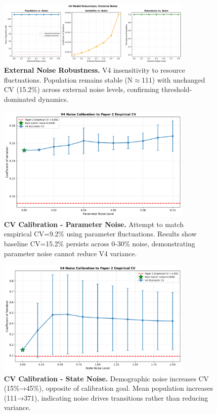 \documentclass[
]{article}
\begin{document}
\begin{figure}[htbp]
\centering
\includegraphics[width=0.85\textwidth]{figures/paper7_fig10_robustness_external.png}
\caption{\textbf{External Noise Robustness.} V4 insensitivity to resource fluctuations. Population remains stable (N$\approx$111) with unchanged CV (15.2\%) across external noise levels, confirming threshold-dominated dynamics.}
\label{fig:robustness-external}
\end{figure}

\begin{figure}[htbp]
\centering
\includegraphics[width=0.85\textwidth]{figures/paper7_fig11_cv_calibration_parameter.png}
\caption{\textbf{CV Calibration - Parameter Noise.} Attempt to match empirical CV=9.2\% using parameter fluctuations. Results show baseline CV=15.2\% persists across 0-30\% noise, demonstrating parameter noise cannot reduce V4 variance.}
\label{fig:cv-parameter}
\end{figure}

\begin{figure}[htbp]
\centering
\includegraphics[width=0.85\textwidth]{figures/paper7_fig12_cv_calibration_state.png}
\caption{\textbf{CV Calibration - State Noise.} Demographic noise increases CV (15\%→45\%), opposite of calibration goal. Mean population increases (111→371), indicating noise drives transitions rather than reducing variance.}
\label{fig:cv-state}
\end{figure}
\end{document}
